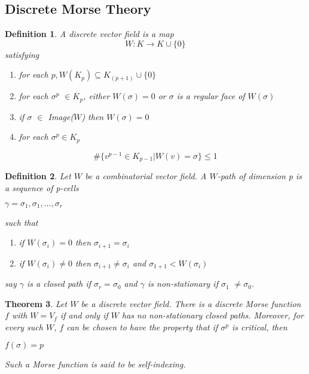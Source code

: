\documentclass{amsart}
\newtheorem{theorem}{Theorem}[section]
\newtheorem{Definition}[theorem]{Definition}
\newenvironment{definition}{\begin{Definition}\normalfont}{\end{Definition}}
\begin{document}
\subsection{Discrete Morse Theory}
\begin{definition} \cite{RFOR}
A \textit{discrete vector field} is a map
\begin{equation}
W: K \rightarrow K \cup \{0\}
\end{equation}
satisfying 
\begin{enumerate}
\item for each $ p, W(K_p) \subseteq K_{(p+1)} \cup \{0\}$
\item for each $\sigma^p$ $\in K_p$, either $W(\sigma) = 0$ or $\sigma$ is a regular face of $W(\sigma)$ 
\item if $\sigma$ $\in$ Image($W$) then $W(\sigma) = 0$
\item for each $\sigma^p \in K_p$ 
\end{enumerate}
\begin{equation}
\# \{v^{p-1} \in K_{p-1}  |  W(v) = \sigma\} \leq 1
\end{equation}
\end{definition}

\begin{definition} \cite{RFOR}
Let $W$ be a combinatorial vector field. A $W$-\textit{path of dimension p} is a sequence of p-cells
\begin{center}
$\gamma = \sigma_1, \sigma_1, ..., \sigma_r$
\end{center}
such that
\begin{enumerate}
\item if $W(\sigma_i) = 0$ then $\sigma_{i+1} = \sigma_i$
\item if $W(\sigma_i) \neq 0$ then $\sigma_{i+1} \neq \sigma_i$ and $\sigma_{1+1} <W(\sigma_i)$ 
\end{enumerate}
say $\gamma$ is a \textit{closed path} if $\sigma_r = \sigma_0$ and $\gamma$ is \textit{non-stationary} if $\sigma_1$ $\neq \sigma_0$. 
\end{definition}
\begin{theorem}
Let $W$ be a discrete vector field. There is a discrete Morse
function $f$ with $W=V_f$ if and only if $W$ has no non-stationary closed paths. Moreover, for every such $W$, $f$ can be chosen to have the property that if
$\sigma^{p}$ is critical, then
\begin{center}
$f({\sigma})=p$
\end{center}
Such a Morse function is said to be self-indexing.
\end{theorem}
\end{document}
